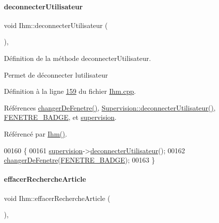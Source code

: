 \paragraph{\texorpdfstring{deconnecter\+Utilisateur}{deconnecterUtilisateur}}
{\footnotesize\ttfamily void Ihm\+::deconnecter\+Utilisateur (\begin{DoxyParamCaption}{ }\end{DoxyParamCaption})\hspace{0.3cm}{\ttfamily [private]}, {\ttfamily [slot]}}



Définition de la méthode deconnecter\+Utilisateur. 

Permet de déconnecter l\textquotesingle{}utilisateur 

Définition à la ligne \hyperlink{_ihm_8cpp_source_l00159}{159} du fichier \hyperlink{_ihm_8cpp_source}{Ihm.\+cpp}.



Références \hyperlink{_ihm_8cpp_source_l00077}{changer\+De\+Fenetre()}, \hyperlink{_supervision_8cpp_source_l00076}{Supervision\+::deconnecter\+Utilisateur()}, \hyperlink{_ihm_8h_source_l00026}{F\+E\+N\+E\+T\+R\+E\+\_\+\+B\+A\+D\+GE}, et \hyperlink{_ihm_8h_source_l00100}{supervision}.



Référencé par \hyperlink{_ihm_8cpp_source_l00029}{Ihm()}.


\begin{DoxyCode}
00160 \{
00161     \hyperlink{class_ihm_a454ab89ced1b27fcb42d550e443e780c}{supervision}->\hyperlink{class_supervision_a164a1ad89264ea252401818df325eab8}{deconnecterUtilisateur}();
00162     \hyperlink{class_ihm_ab33d5d0a85d60a8d41bae11c34435d50}{changerDeFenetre}(\hyperlink{_ihm_8h_a280ed5a4ea1cf0cd4c224443fa33db12a1f316de8685375f757a120ce0fde7af2}{FENETRE\_BADGE});
00163 \}
\end{DoxyCode}
\mbox{\label{class_ihm_acb37df89789d7c82be7336519091bc1f}} 
\paragraph{\texorpdfstring{effacer\+Recherche\+Article}{effacerRechercheArticle}}
{\footnotesize\ttfamily void Ihm\+::effacer\+Recherche\+Article (\begin{DoxyParamCaption}{ }\end{DoxyParamCaption})\hspace{0.3cm}{\ttfamily [private]}, {\ttfamily [slot]}}




